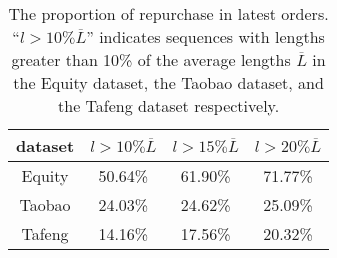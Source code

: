 \begin{table}[htbp]
    \footnotesize
    \centering
    \caption{The proportion of repurchase in latest orders. ``$l>10\%\overline{L}$'' indicates sequences with lengths greater than 10\% of the average lengths $\overline{L}$ in the Equity dataset, the Taobao dataset, and the Tafeng dataset respectively. }
    \begin{tabular}{ cccc }
    \hline
    { dataset } &$l>10\%\overline{L}$ & $l>15\%\overline{L}$ & $l> 20\% \overline{L}$ \\
    \hline
    Equity     & 50.64\%     & 61.90\%  & 71.77\%     \\
    Taobao    & 24.03\%     & 24.62\%  & 25.09\%    \\
    Tafeng    & 14.16\%     & 17.56\%  & 20.32\%    \\
    \hline
    \end{tabular}
    \label{repur_chara_dataset}
\end{table}